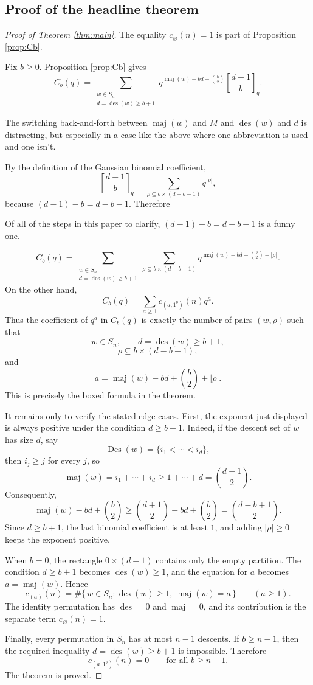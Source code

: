 \documentclass[12pt]{article}
\DeclareMathOperator{\Des}{Des}
\DeclareMathOperator{\des}{des}
\DeclareMathOperator{\maj}{maj}
\newcommand{\qbinom}[2]{\genfrac{[}{]}{0pt}{}{#1}{#2}_q}
\newcommand{\review}[1]{\begin{reviewbox}#1\end{reviewbox}}
\begin{document}
\subsection{Proof of the headline theorem}

\begin{proof}[Proof of Theorem \ref{thm:main}]
The equality \(c_{\varnothing}(n)=1\) is part of Proposition \ref{prop:Cb}.

Fix \(b\ge 0\).  Proposition \ref{prop:Cb} gives
\[
C_b(q)
=
\sum_{\substack{w\in S_n\\ d=\des(w)\ge b+1}}
q^{\maj(w)-bd+\binom{b}{2}}
\qbinom{d-1}{b}.
\]

\review{The switching back-and-forth between $\maj(w)$ and $M$ and $\des(w)$ and $d$ is distracting, but especially in a case like the above where one abbreviation is used and one isn't.}

By the definition of the Gaussian binomial coefficient,
\[
\qbinom{d-1}{b}
=
\sum_{\rho\subseteq b\times(d-b-1)}q^{|\rho|},
\]
because \((d-1)-b=d-b-1\).  Therefore

\review{Of all of the steps in this paper to clarify, $(d-1)-b=d-b-1$ is a funny one.}
\[
C_b(q)
=
\sum_{\substack{w\in S_n\\ d=\des(w)\ge b+1}}
\sum_{\rho\subseteq b\times(d-b-1)}
q^{\maj(w)-bd+\binom{b}{2}+|\rho|}.
\]
On the other hand,
\[
C_b(q)=\sum_{a\ge 1}c_{(a,1^b)}(n)q^a.
\]
Thus the coefficient of \(q^a\) in \(C_b(q)\) is exactly the number of pairs \((w,\rho)\) such that
\[
w\in S_n,\qquad d=\des(w)\ge b+1,
\]
\[
\rho\subseteq b\times(d-b-1),
\]
and
\[
a=\maj(w)-bd+\binom{b}{2}+|\rho|.
\]
This is precisely the boxed formula in the theorem.

It remains only to verify the stated edge cases.  First, the exponent just displayed is always positive under the condition \(d\ge b+1\).  Indeed, if the descent set of \(w\) has size \(d\), say
\[
\Des(w)=\{i_1<\cdots<i_d\},
\]
then \(i_j\ge j\) for every \(j\), so
\[
\maj(w)=i_1+\cdots+i_d\ge 1+\cdots+d=\binom{d+1}{2}.
\]
Consequently,
\[
\maj(w)-bd+\binom{b}{2}
\ge
\binom{d+1}{2}-bd+\binom{b}{2}
=
\binom{d-b+1}{2}.
\]
Since \(d\ge b+1\), the last binomial coefficient is at least \(1\), and adding \(|\rho|\ge 0\) keeps the exponent positive.

When \(b=0\), the rectangle \(0\times(d-1)\) contains only the empty partition.  The condition \(d\ge b+1\) becomes \(\des(w)\ge 1\), and the equation for \(a\) becomes \(a=\maj(w)\).  Hence
\[
c_{(a)}(n)
=
\#\{\,w\in S_n:\des(w)\ge 1,\ \maj(w)=a\,\}
\qquad (a\ge 1).
\]
The identity permutation has \(\des=0\) and \(\maj=0\), and its contribution is the separate term \(c_{\varnothing}(n)=1\).

Finally, every permutation in \(S_n\) has at most \(n-1\) descents.  If \(b\ge n-1\), then the required inequality \(d=\des(w)\ge b+1\) is impossible.  Therefore
\[
c_{(a,1^b)}(n)=0
\qquad\text{for all }b\ge n-1.
\]
The theorem is proved.
\end{proof}
\end{document}

